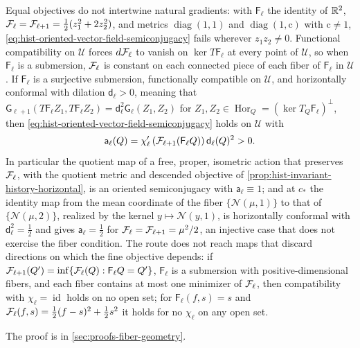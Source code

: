 Equal objectives do not intertwine natural gradients: with $\mathsf F_\ell$ the identity
of $\mathbb R^2$, $\mathcal F_\ell=\mathcal F_{\ell+1}=\tfrac12(z_1^2+2z_2^2)$, and metrics
$\operatorname{diag}(1,1)$ and $\operatorname{diag}(1,\mathrm c)$ with $\mathrm c\ne1$,
\eqref{eq:hist-oriented-vector-field-semiconjugacy} fails wherever $z_1z_2\ne0$.
Functional compatibility on $\mathcal U$ forces $d\mathcal F_\ell$ to vanish on
$\ker T\mathsf F_\ell$ at every point of $\mathcal U$, so when $\mathsf F_\ell$ is a
submersion, $\mathcal F_\ell$ is constant on each connected piece of each fiber of
$\mathsf F_\ell$ in $\mathcal U$.  If $\mathsf F_\ell$ is a surjective submersion,
functionally compatible on $\mathcal U$, and horizontally conformal with dilation
$\mathsf d_\ell>0$, meaning that
$\mathsf G_{\ell+1}(T\mathsf F_\ell Z_1,T\mathsf F_\ell Z_2)=\mathsf d_\ell^2\mathsf
G_\ell(Z_1,Z_2)$ for $Z_1,Z_2\in\operatorname{Hor}_Q=(\ker T_Q\mathsf F_\ell)^\perp$, then
\eqref{eq:hist-oriented-vector-field-semiconjugacy} holds on $\mathcal U$ with
\begin{equation}
\mathsf a_\ell(Q)
=\chi_\ell'\left(\mathcal F_{\ell+1}(\mathsf F_\ell Q)\right)
\mathsf d_\ell(Q)^2>0 .
\label{eq:hist-conformal-semiconjugacy-factor}
\end{equation}
In particular the quotient map of a free, proper, isometric action that preserves
$\mathcal F_\ell$, with the quotient metric and descended objective of
\cref{prop:hist-invariant-history-horizontal}, is an oriented semiconjugacy with
$\mathsf a_\ell\equiv1$; and at $c_*$ the identity map from the mean coordinate of the
fiber $\{\mathcal N(\mu,1)\}$ to that of $\{\mathcal N(\mu,2)\}$, realized by the kernel
$y\mapsto\mathcal N(y,1)$, is horizontally conformal with $\mathsf d_\ell^2=\tfrac12$ and
gives $\mathsf a_\ell=\tfrac12$ for $\mathcal F_\ell=\mathcal F_{\ell+1}=\mu^2/2$, an
injective case that does not exercise the fiber condition.  The route does not reach
maps that discard directions on which the fine objective depends: if
$\mathcal F_{\ell+1}(Q')=\inf\{\mathcal F_\ell(Q):\mathsf F_\ell Q=Q'\}$, $\mathsf F_\ell$ is
a submersion with positive-dimensional fibers, and each fiber contains at most one
minimizer of $\mathcal F_\ell$, then compatibility with $\chi_\ell=\operatorname{id}$ holds
on no open set; for $\mathsf F_\ell(f,s)=s$ and
$\mathcal F_\ell(f,s)=\tfrac12(f-s)^2+\tfrac12s^2$ it holds for no $\chi_\ell$ on any open
set.  

The proof is in \cref{sec:proofs-fiber-geometry}.

